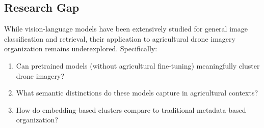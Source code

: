\subsection{Research Gap}

While vision-language models have been extensively studied for general image classification and retrieval, their application to agricultural drone imagery organization remains underexplored. Specifically:

\begin{enumerate}
    \item Can pretrained models (without agricultural fine-tuning) meaningfully cluster drone imagery?
    \item What semantic distinctions do these models capture in agricultural contexts?
    \item How do embedding-based clusters compare to traditional metadata-based organization?
\end{enumerate}

